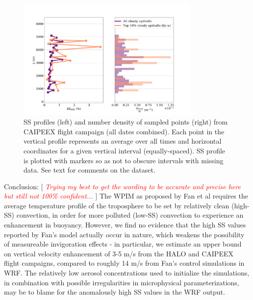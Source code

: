 \documentclass{article}
\newcommand{\klcomm}[1]{\textcolor{red}{\textit{#1}}}
\begin{document}

\begin{figure}[ht]
    \centering
    \includegraphics[width=9cm]{revcaipeex/v2_FINAL_combined_bipanel_ss_qss_vs_z_figure.png}
    \caption{SS profiles (left) and number density of sampled points (right) from CAIPEEX flight campaign (all dates combined). Each point in the vertical profile represents an average over all times and horizontal coordinates for a given vertical interval (equally-spaced). SS profile is plotted with markers so as not to obscure intervals with missing data. See text for comments on the dataset.}
    \label{caipeexbipanel}
\end{figure}

Conclusion: [ \klcomm{Trying my best to get the wording to be accurate and precise here but still not 100\% confident...} ] The WPIM as proposed by Fan et al requires the average temperature profile of the troposphere to be set by relatively clean (high-SS) convection, in order for more polluted (low-SS) convection to experience an enhancement in buoyancy. However, we find no evidence that the high SS values reported by Fan's model actually occur in nature, which weakens the possibility of measureable invigoration effects - in particular, we estimate an upper bound on vertical velocity enhancement of 3-5 m/s from the HALO and CAIPEEX flight campaigns, compared to roughly 14 m/s from Fan's control simulations in WRF. The relatively low aerosol concentrations used to initialize the simulations, in combination with possible irregularities in microphysical parameterizations, may be to blame for the anomalously high SS values in the WRF output.
\end{document}
